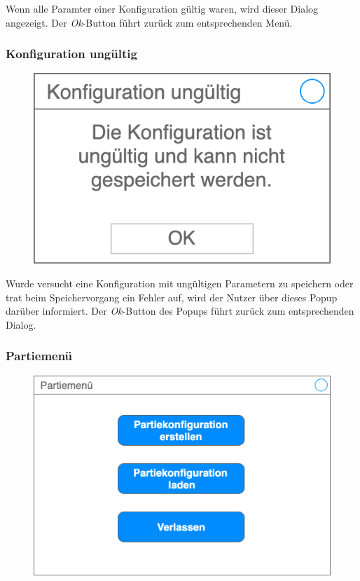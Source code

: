     Wenn alle Paramter einer Konfiguration gültig waren, wird dieser Dialog angezeigt. Der \textit{Ok}-Button führt zurück zum entsprechenden Menü.

    \subsubsection{Konfiguration ungültig}

    \begin{figure}[H]
        \centering
        \includegraphics[width=\textwidth/2]{../Meilenstein03/images/konfiguration_ungueltig}
    \end{figure}

    Wurde versucht eine Konfiguration mit ungültigen Parametern zu speichern oder trat beim Speichervorgang ein Fehler auf, wird der Nutzer über dieses Popup darüber informiert. Der \textit{Ok}-Button des Popups führt zurück zum entsprechenden Dialog.

    \subsubsection{Partiemenü}

    \begin{figure}[H]
        \centering
        \includegraphics[width=\textwidth/2]{../Meilenstein03/images/partiemenue}
    \end{figure}

